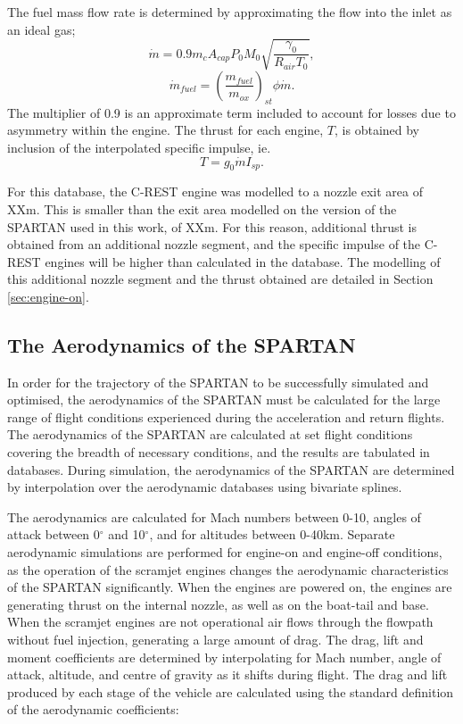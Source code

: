 The fuel mass flow rate is determined by approximating the flow into the inlet as an ideal gas; 
\begin{equation}
\dot{m} = 0.9 m_c A_{cap} P_0 M_0 \sqrt{\dfrac{\gamma_0}{R_{air} T_0}},
\end{equation}
\begin{equation}
\dot{m}_{fuel} = (\dfrac{m_{fuel}}{m_{ox}} )_{st} \phi \dot{m}.
\end{equation}
The multiplier of 0.9 is an approximate term included to account for losses due to asymmetry within the engine\cite{Preller2018}. 
The thrust for each engine, $T$, is obtained by inclusion of the interpolated specific impulse, ie. 
\begin{equation}
T = g_0\dot{m}I_{sp}. 
\end{equation}

For this database, the C-REST engine was modelled to a nozzle exit area of XXm. This is smaller than the exit area modelled on the version of the SPARTAN used in this work, of XXm. For this reason, additional thrust is obtained from an additional nozzle segment, and the specific impulse of the C-REST engines will be higher than calculated in the database. The modelling of this additional nozzle segment and the thrust obtained are detailed in Section \ref{sec:engine-on}.






		
		
		\subsection{The Aerodynamics of the SPARTAN}\label{sec:aero}
		
		
		
In order for the trajectory of the SPARTAN to be successfully simulated and optimised, the aerodynamics of the SPARTAN must be calculated for the large range of flight conditions experienced during the acceleration and return flights. 
The aerodynamics of the SPARTAN are calculated at set flight conditions covering the breadth of necessary conditions, and the results are tabulated in databases. During simulation, the aerodynamics of the SPARTAN are determined by interpolation over the aerodynamic databases using bivariate splines. 


The aerodynamics are calculated for Mach numbers between 0-10, angles of attack between 0$^\circ$ and 10$^\circ$, and for altitudes between 0-40km. Separate aerodynamic simulations are performed for engine-on and engine-off conditions, as the operation of the scramjet engines changes the aerodynamic characteristics of the SPARTAN significantly. When the engines are powered on, the engines are generating thrust on the internal nozzle, as well as on the boat-tail and base.  When the scramjet engines are not operational air flows through the flowpath without fuel injection, generating a large amount of drag. 
The drag, lift and moment coefficients are determined by interpolating for Mach number, angle of attack, altitude, and centre of gravity as it shifts during flight.
		The drag and lift produced by each stage of the vehicle are calculated using the standard definition of the aerodynamic coefficients:
		
